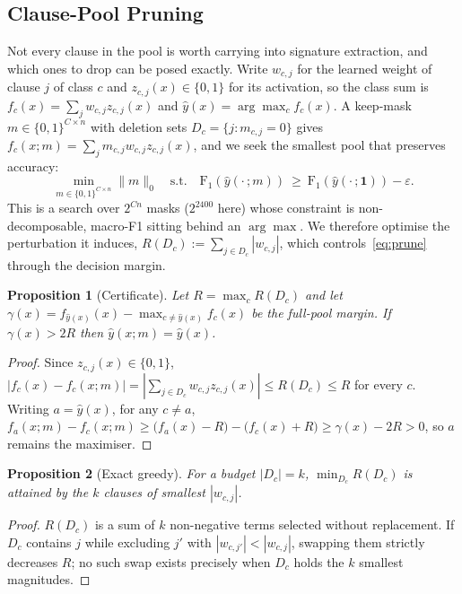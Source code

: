 \documentclass[conference]{IEEEtran}
\newtheorem{proposition}{Proposition}
\begin{document}
\subsection{Clause-Pool Pruning}
\label{sec:prune}
Not every clause in the pool is worth carrying into signature extraction,
and which ones to drop can be posed exactly. Write $w_{c,j}$ for the
learned weight of clause $j$ of class $c$ and $z_{c,j}(x) \in \{0,1\}$ for
its activation, so the class sum is $f_c(x)=\sum_j w_{c,j} z_{c,j}(x)$ and
$\hat{y}(x)=\arg\max_c f_c(x)$. A keep-mask
$m \in \{0,1\}^{C \times n}$ with deletion sets $D_c=\{j: m_{c,j}=0\}$
gives $f_c(x;m)=\sum_j m_{c,j} w_{c,j} z_{c,j}(x)$, and we seek the
smallest pool that preserves accuracy:
\begin{equation}
\min_{m \in \{0,1\}^{C \times n}} \lVert m \rVert_0
\quad\text{s.t.}\quad
\mathrm{F_1}\!\left(\hat{y}(\cdot\,;m)\right) \ \ge\
\mathrm{F_1}\!\left(\hat{y}(\cdot\,;\mathbf{1})\right) - \varepsilon .
\label{eq:prune}
\end{equation}
This is a search over $2^{Cn}$ masks ($2^{2400}$ here) whose constraint is
non-decomposable, macro-F1 sitting behind an $\arg\max$. We therefore
optimise the perturbation it induces,
$R(D_c) := \sum_{j \in D_c} |w_{c,j}|$, which controls~\eqref{eq:prune} through the
decision margin.

\begin{proposition}[Certificate]
\label{prop:cert}
Let $R = \max_c R(D_c)$ and let
$\gamma(x)=f_{\hat{y}(x)}(x)-\max_{c \neq \hat{y}(x)} f_c(x)$ be the
full-pool margin. If $\gamma(x) > 2R$ then $\hat{y}(x;m)=\hat{y}(x)$.
\end{proposition}
\begin{proof}
Since $z_{c,j}(x) \in \{0,1\}$,
$|f_c(x)-f_c(x;m)| = |\sum_{j \in D_c} w_{c,j} z_{c,j}(x)| \le R(D_c) \le R$
for every $c$. Writing $a=\hat{y}(x)$, for any $c \neq a$,
$f_a(x;m)-f_c(x;m) \ge \bigl(f_a(x)-R\bigr)-\bigl(f_c(x)+R\bigr)
\ge \gamma(x)-2R > 0$, so $a$ remains the maximiser.
\end{proof}

\begin{proposition}[Exact greedy]
\label{prop:greedy}
For a budget $|D_c| = k$, $\min_{D_c} R(D_c)$ is attained by the $k$
clauses of smallest $|w_{c,j}|$.
\end{proposition}
\begin{proof}
$R(D_c)$ is a sum of $k$ non-negative terms selected without replacement.
If $D_c$ contains $j$ while excluding $j'$ with $|w_{c,j'}| < |w_{c,j}|$,
swapping them strictly decreases $R$; no such swap exists precisely when
$D_c$ holds the $k$ smallest magnitudes.
\end{proof}
\end{document}
